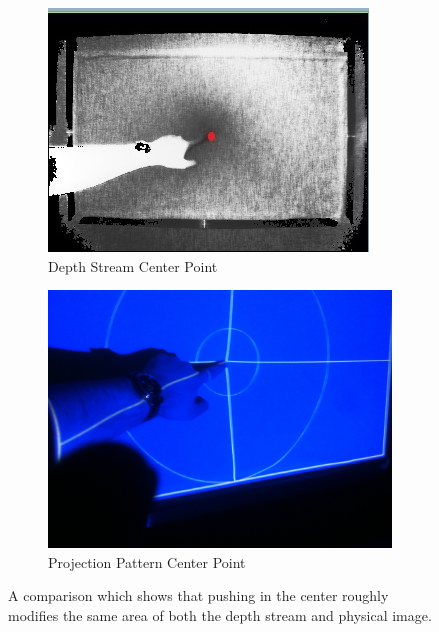 \documentclass[]{article}
\begin{document}
\begin{figure}
\centering
\begin{subfigure}{.5\textwidth}
  \centering
  \includegraphics[width=0.9\linewidth]{figures/DepthStreamCenterPoint.jpg}
  \caption{Depth Stream Center Point}
  \label{fig:DepthStreamCenterPoint}
\end{subfigure}%
\begin{subfigure}{.5\textwidth}
  \centering
  \includegraphics[width=0.9\linewidth]{figures/CenterPointPattern.JPG}
  \caption{Projection Pattern Center Point}
  \label{fig:CenterPointPattern}
\end{subfigure}
\caption{A comparison which shows that pushing in the center roughly modifies the same area of both the depth stream and physical image.}
\label{fig:CenterPointAlignment}
\end{figure}
\end{document}
